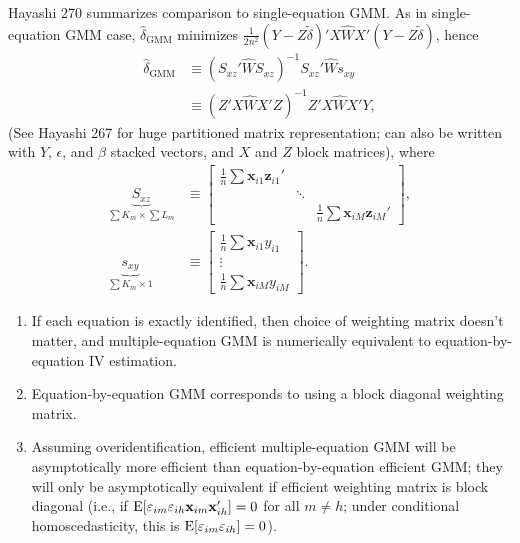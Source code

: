 \documentclass[8pt,letterpaper, landscape]{extarticle} %
\newcommand{\mx}{\ensuremath{\mathbf{x}}}
\begin{document}
\begin{multicols}{3}
\begin{description}
 Hayashi 270 summarizes comparison to single-equation GMM. As in single-equation GMM case, $ \hat{\delta}_{\text{GMM}}  $ minimizes $ \frac{1}{2n^2} (Y - Z \tilde{\delta})' X \widehat{W} X' (Y - Z \tilde{\delta}) $, hence
\begin{align*}
\hat{\delta}_{\text{GMM}} &\equiv (S_{xz}' \widehat{W} S_{xz})^{-1} S_{xz}' \widehat{W} s_{xy} \\
&\equiv (Z' X \widehat{W} X' Z)^{-1} Z' X \widehat{W} X' Y ,
\end{align*}
(See Hayashi 267 for huge partitioned matrix representation; can also be written with $ Y $, $ \epsilon $, and $ \beta $ stacked vectors, and $ X $ and $ Z $ block matrices), where
\begin{align*}
\underbrace{S_{xz}}_{\sum K_m \times \sum L_m} &\equiv \begin{bmatrix}
\tfrac{1}{n} \sum \mx_{i1} \mathbf{z}_{i1}' & & \\
& \ddots & \\
& & \tfrac{1}{n} \sum \mx_{iM} \mathbf{z}_{iM}'
\end{bmatrix}, \\
\underbrace{s_{xy}}_{\sum K_m \times 1}  &\equiv \begin{bmatrix}
\tfrac{1}{n} \sum \mx_{i1} y_{i1} \\
\vdots \\
\tfrac{1}{n} \sum \mx_{iM} y_{iM}
\end{bmatrix}.
\end{align*}
\begin{enumerate}
\item If each equation is exactly identified, then choice of weighting matrix doesn't matter, and multiple-equation GMM is numerically equivalent to equation-by-equation IV estimation.
\item Equation-by-equation GMM corresponds to using a block diagonal weighting matrix.
\item Assuming overidentification, efficient multiple-equation GMM will be asymptotically more efficient than equation-by-equation efficient GMM; they will only be asymptotically equivalent if efficient weighting matrix is block diagonal (i.e., if $ \E [\epsilon_{im} \epsilon_{ih} \mx_{im} \mx_{ih}'] = 0 $ for all $  m \neq h $; under conditional homoscedasticity, this is $ \operatorname{E} [\varepsilon_{im} \varepsilon_{ih}] = 0 $).
\end{enumerate}


\end{description}
\end{multicols}
\end{document}
